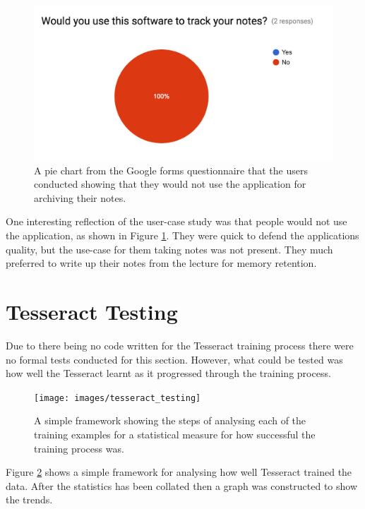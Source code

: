 \begin{figure}[h!]
  \centering
  \includegraphics[scale=0.5]{images/user_response}
  \caption{A pie chart from the Google forms questionnaire that the users conducted showing that they would not use the application for archiving their notes.}
  \label{fig:user_response}
\end{figure}

One interesting reflection of the user-case study was that people would not use the application, as shown in Figure \ref{fig:user_response}. They were quick to defend the applications quality, but the use-case for them taking notes was not present. They much preferred to write up their notes from the lecture for memory retention.

\section{Tesseract Testing}
Due to there being no code written for the Tesseract training process there were no formal tests conducted for this section. However, what could be tested was how well the Tesseract learnt as it progressed through the training process.

\begin{figure}[h!]
  \centering
  \texttt{[image: images/tesseract\_testing]}
  \caption{A simple framework showing the steps of analysing each of the training examples for a statistical measure for how successful the training process was.}
  \label{fig:tesseract_framework}
\end{figure}

Figure \ref{fig:tesseract_framework} shows a simple framework for analysing how well Tesseract trained the data. After the statistics has been collated then a graph was constructed to show the trends.

